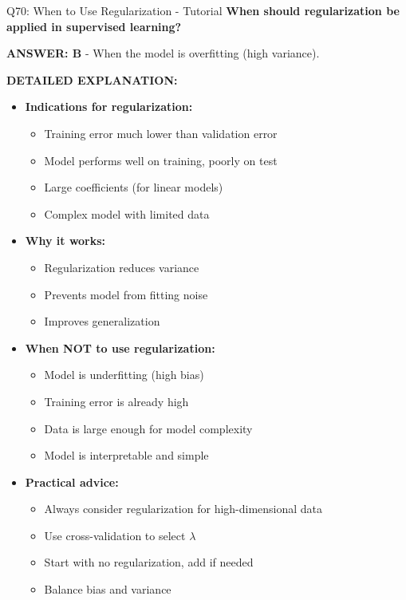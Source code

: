 \documentclass[8pt]{beamer}
\begin{document}
	\begin{frame}{Q70: When to Use Regularization - Tutorial}
		\fontsize{6.5}{7.5}\selectfont
		\textbf{When should regularization be applied in supervised learning?}
		
		\vspace{0.05cm}
		\textcolor{myblue}{\textbf{ANSWER: B}} - When the model is overfitting (high variance).
		
		\vspace{0.05cm}
		\textbf{DETAILED EXPLANATION:}
		\begin{itemize}
			\item \textbf{Indications for regularization:}
			\begin{itemize}
				\item Training error much lower than validation error
				\item Model performs well on training, poorly on test
				\item Large coefficients (for linear models)
				\item Complex model with limited data
			\end{itemize}
			\item \textbf{Why it works:}
			\begin{itemize}
				\item Regularization reduces variance
				\item Prevents model from fitting noise
				\item Improves generalization
			\end{itemize}
			\item \textbf{When NOT to use regularization:}
			\begin{itemize}
				\item Model is underfitting (high bias)
				\item Training error is already high
				\item Data is large enough for model complexity
				\item Model is interpretable and simple
			\end{itemize}
			\item \textbf{Practical advice:}
			\begin{itemize}
				\item Always consider regularization for high-dimensional data
				\item Use cross-validation to select $\lambda$
				\item Start with no regularization, add if needed
				\item Balance bias and variance
			\end{itemize}
		\end{itemize}
		

\end{frame}
\end{document}
